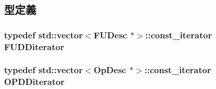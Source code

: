 \subsection{型定義}
\hypertarget{func__unit_8hh_a4feb205c35c8717d4fbce7db6f79bbca}{
\subsubsection[{FUDDiterator}]{\setlength{\rightskip}{0pt plus 5cm}typedef {\bf std::vector}$<${\bf FUDesc} $\ast$$>$::const\_\-iterator {\bf FUDDiterator}}}
\label{func__unit_8hh_a4feb205c35c8717d4fbce7db6f79bbca}
\hypertarget{func__unit_8hh_a7c8030986ef4945661cc7c73e2cb54ad}{
\subsubsection[{OPDDiterator}]{\setlength{\rightskip}{0pt plus 5cm}typedef {\bf std::vector}$<${\bf OpDesc} $\ast$$>$::const\_\-iterator {\bf OPDDiterator}}}
\label{func__unit_8hh_a7c8030986ef4945661cc7c73e2cb54ad}
